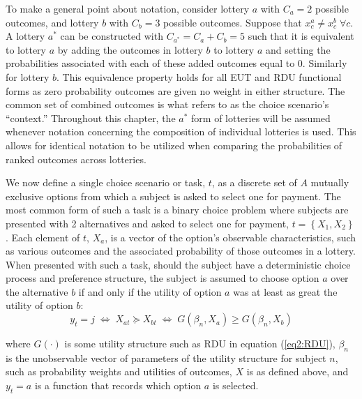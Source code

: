 \documentclass[../main.tex]{subfiles}
\begin{document}
To make a general point about notation, consider lottery $a$ with $C_a = 2$ possible outcomes, and lottery $b$ with $C_b = 3$ possible outcomes.
Suppose that $x_c^a \neq x_c^b \; \forall c$.
A lottery $a^*$ can be constructed with $C_{a^*}= C_a + C_b = 5$ such that it is equivalent to lottery $a$ by adding the outcomes in lottery $b$ to lottery $a$ and setting the probabilities associated with each of these added outcomes equal to $0$.
Similarly for lottery $b$.
This equivalence property holds for all EUT and RDU functional forms as zero probability outcomes are given no weight in either structure.
The common set of combined outcomes is what \textcite{Wilcox2008} refers to as the choice scenario's \enquote{context.}
Throughout this chapter, the $a^*$ form of lotteries will be assumed whenever notation concerning the composition of individual lotteries is used.
This allows for identical notation to be utilized when comparing the probabilities of ranked outcomes across lotteries.

We now define a single choice scenario or task, $t$, as a discrete set of $A$ mutually exclusive options from which a subject is asked to select one for payment.
The most common form of such a task is a binary choice problem where subjects are presented with 2 alternatives and asked to select one for payment, $t=\left\{X_1,X_2\right\}$ .
Each element of $t$, $X_a$, is a vector of the option's observable characteristics, such as various outcomes and the associated probability of those outcomes in a lottery.
When presented with such a task, should the subject have a deterministic choice process and preference structure, the subject is assumed to choose option $a$ over the alternative $b$ if and only if the utility of option $a$ was at least as great the utility of option $b$:
\begin{equation}
	\label{eq2:ychoice}
	y_t = j \;\Leftrightarrow\; X_{at} \succcurlyeq X_{bt} \;\Leftrightarrow\; G(\beta_n , X_a) \geq G(\beta_n , X_b)
\end{equation}

\noindent where $G(\cdot)$ is some utility structure such as RDU in equation (\ref{eq2:RDU}), $\beta_n$ is the unobservable vector of parameters of the utility structure for subject $n$, such as probability weights and utilities of outcomes, $X$ is as defined above, and $y_t=a$ is a function that records which option $a$ is selected.
\end{document}
